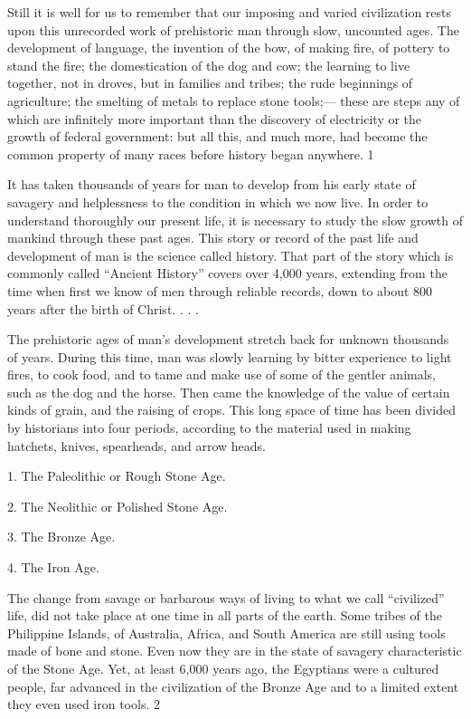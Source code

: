 Still it is well for us to remember that our imposing and varied civilization rests upon this
unrecorded work of prehistoric man through slow, uncounted ages. The development of
language, the invention of the bow, of making fire, of pottery to stand the fire; the
domestication of the dog and cow; the learning to live together, not in droves, but in families
and tribes; the rude beginnings of agriculture; the smelting of metals to replace stone tools;—
these are steps any of which are infinitely more important than the discovery of electricity or
the growth of federal government: but all this, and much more, had become the common
property of many races before history began anywhere. 1

It has taken thousands of years for man to develop from his early state of savagery and
helplessness to the condition in which we now live. In order to understand thoroughly our
present life, it is necessary to study the slow growth of mankind through these past ages. This
story or record of the past life and development of man is the science called history. That part
of the story which is commonly called ``Ancient History'' covers over 4,000 years, extending
from the time when first we know of men through reliable records, down to about 800 years
after the birth of Christ. . . .

The prehistoric ages of man's development stretch back for unknown thousands of years.
During this time, man was slowly learning by bitter experience to light fires, to cook food,
and to tame and make use of some of the gentler animals, such as the dog and the horse.
Then came the knowledge of the value of certain kinds of grain, and the raising of crops.
This long space of time has been divided by historians into four periods, according to the
material used in making hatchets, knives, spearheads, and arrow heads.

1. The Paleolithic or Rough Stone Age.

2. The Neolithic or Polished Stone Age.

3. The Bronze Age.

4. The Iron Age.

The change from savage or barbarous ways of living to what we call ``civilized'' life, did not
take place at one time in all parts of the earth. Some tribes of the Philippine Islands, of
Australia, Africa, and South America are still using tools made of bone and stone. Even now
they are in the state of savagery characteristic of the Stone Age. Yet, at least 6,000 years ago,
the Egyptians were a cultured people, far advanced in the civilization of the Bronze Age and
to a limited extent they even used iron tools. 2

